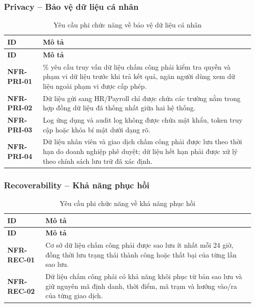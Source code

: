 \subsubsection{Privacy -- Bảo vệ dữ liệu cá nhân}
\begingroup
\small
\renewcommand{\arraystretch}{1.2}
\begin{longtable}{|>{\centering\arraybackslash}m{3cm}|>{\raggedright\arraybackslash}m{12.9cm}|}
    \caption{Yêu cầu phi chức năng về bảo vệ dữ liệu cá nhân}\label{tab:nfr-privacy}\\
    \hline
    \textbf{ID} & \textbf{Mô tả}\\
    \hline
    \endfirsthead
    \hline
    \textbf{ID} & \textbf{Mô tả}\\
    \hline
    \endhead
    \hline
    \endfoot
    \hline
    \endlastfoot
    \textbf{NFR-PRI-01} & 100\% yêu cầu truy vấn dữ liệu chấm công phải kiểm tra quyền và phạm vi dữ liệu trước khi trả kết quả, ngăn người dùng xem dữ liệu ngoài phạm vi được cấp phép.\\
    \hline
    \textbf{NFR-PRI-02} & Dữ liệu gửi sang HR/Payroll chỉ được chứa các trường nằm trong hợp đồng dữ liệu đã thống nhất giữa hai hệ thống.\\
    \hline
    \textbf{NFR-PRI-03} & Log ứng dụng và audit log không được chứa mật khẩu, token truy cập hoặc khóa bí mật dưới dạng rõ.\\
    \hline
    \textbf{NFR-PRI-04} & Dữ liệu nhân viên và giao dịch chấm công phải được lưu theo thời hạn do doanh nghiệp phê duyệt; dữ liệu hết hạn phải được xử lý theo chính sách lưu trữ đã xác định.\\
    \hline
\end{longtable}
\endgroup

\subsubsection{Recoverability -- Khả năng phục hồi}
\begingroup
\small
\renewcommand{\arraystretch}{1.2}
\begin{longtable}{|>{\centering\arraybackslash}m{3cm}|>{\raggedright\arraybackslash}m{12.9cm}|}
    \caption{Yêu cầu phi chức năng về khả năng phục hồi}\label{tab:nfr-recoverability}\\
    \hline
    \textbf{ID} & \textbf{Mô tả}\\
    \hline
    \endfirsthead
    \hline
    \textbf{ID} & \textbf{Mô tả}\\
    \hline
    \endhead
    \hline
    \endfoot
    \hline
    \endlastfoot
    \textbf{NFR-REC-01} & Cơ sở dữ liệu chấm công phải được sao lưu ít nhất mỗi 24 giờ, đồng thời lưu trạng thái thành công hoặc thất bại của từng lần sao lưu.\\
    \hline
    \textbf{NFR-REC-02} & Dữ liệu chấm công phải có khả năng khôi phục từ bản sao lưu và giữ nguyên mã định danh, thời điểm, mã trạm và hướng vào/ra của từng giao dịch.\\
    \hline
\end{longtable}
\endgroup

